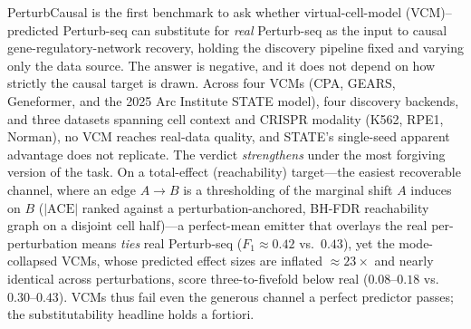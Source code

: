 \documentclass{article}
\theoremstyle{plain}
\theoremstyle{definition}
\theoremstyle{remark}
\begin{document}
PerturbCausal is the first benchmark to ask whether virtual-cell-model (VCM)--predicted Perturb-seq can substitute for \emph{real} Perturb-seq as the input to causal gene-regulatory-network recovery, holding the discovery pipeline fixed and varying only the data source. The answer is negative, and it does not depend on how strictly the causal target is drawn. Across four VCMs (CPA, GEARS, Geneformer, and the 2025 Arc Institute STATE model), four discovery backends, and three datasets spanning cell context and CRISPR modality (K562, RPE1, Norman), no VCM reaches real-data quality, and STATE's single-seed apparent advantage does not replicate. The verdict \emph{strengthens} under the most forgiving version of the task. On a total-effect (reachability) target---the easiest recoverable channel, where an edge $A\!\to\!B$ is a thresholding of the marginal shift $A$ induces on $B$ ($|\mathrm{ACE}|$ ranked against a perturbation-anchored, BH-FDR reachability graph on a disjoint cell half)---a perfect-mean emitter that overlays the real per-perturbation means \emph{ties} real Perturb-seq ($F_1 \approx 0.42$ vs.\ $0.43$), yet the mode-collapsed VCMs, whose predicted effect sizes are inflated $\approx\!23\times$ and nearly identical across perturbations, score three-to-fivefold below real ($0.08$--$0.18$ vs.\ $0.30$--$0.43$). VCMs thus fail even the generous channel a perfect predictor passes; the substitutability headline holds a fortiori.
\end{document}
